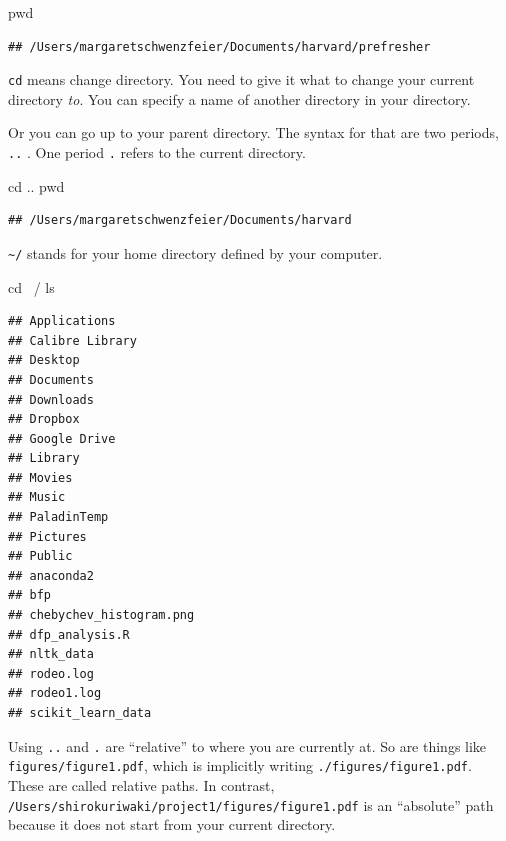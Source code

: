 \documentclass[]{book}
\newenvironment{Shaded}{\begin{snugshade}}{\end{snugshade}}
\newcommand{\BuiltInTok}[1]{#1}
\newcommand{\FunctionTok}[1]{\textcolor[rgb]{0.00,0.00,0.00}{#1}}
\newcommand{\NormalTok}[1]{#1}
\theoremstyle{definition}
\theoremstyle{definition}
\theoremstyle{definition}
\theoremstyle{remark}
\begin{document}
\begin{Shaded}
\begin{Highlighting}[]
\BuiltInTok{pwd}
\end{Highlighting}
\end{Shaded}

\begin{verbatim}
## /Users/margaretschwenzfeier/Documents/harvard/prefresher
\end{verbatim}

\texttt{cd} means change directory. You need to give it what to change your current directory \emph{to}. You can specify a name of another directory in your directory.

Or you can go up to your parent directory. The syntax for that are two periods, \texttt{..} . One period \texttt{.} refers to the current directory.

\begin{Shaded}
\begin{Highlighting}[]
\BuiltInTok{cd}\NormalTok{ ..}
\BuiltInTok{pwd}
\end{Highlighting}
\end{Shaded}

\begin{verbatim}
## /Users/margaretschwenzfeier/Documents/harvard
\end{verbatim}

\texttt{\textasciitilde{}/} stands for your home directory defined by your computer.

\begin{Shaded}
\begin{Highlighting}[]
\BuiltInTok{cd}\NormalTok{ ~/}
\FunctionTok{ls}
\end{Highlighting}
\end{Shaded}

\begin{verbatim}
## Applications
## Calibre Library
## Desktop
## Documents
## Downloads
## Dropbox
## Google Drive
## Library
## Movies
## Music
## PaladinTemp
## Pictures
## Public
## anaconda2
## bfp
## chebychev_histogram.png
## dfp_analysis.R
## nltk_data
## rodeo.log
## rodeo1.log
## scikit_learn_data
\end{verbatim}

Using \texttt{..} and \texttt{.} are ``relative'' to where you are currently at. So are things like \texttt{figures/figure1.pdf}, which is implicitly writing \texttt{./figures/figure1.pdf}. These are called relative paths. In contrast, \texttt{/Users/shirokuriwaki/project1/figures/figure1.pdf} is an ``absolute'' path because it does not start from your current directory.
\end{document}
